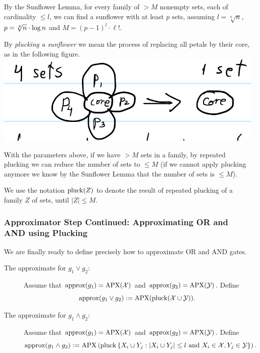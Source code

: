  By the Sunflower Lemma, for every family of $>M$ nonempty sets, each of cardinality $\leq l$, we can find a sunflower with at least $p$ sets, assuming    
$l=\sqrt[8]{n}$, $p =\sqrt[8]{n}\cdot\log n$ and $M=(p-1)^l \cdot \ell!$.

By \emph{plucking a sunflower} we mean the process of replacing all petals by their core, as in the following figure. 
\includegraphics[width=.6\linewidth]{images/pluck.png}


\begin{corollary}
With the parameters above, if we have $>M$ sets in a family, by repeated plucking we can reduce the number of sets to $\leq M$ (if we cannot apply plucking anymore we know by the Sunflower Lemma that the number of sets is $\leq M$).
\end{corollary}
We use the notation 
${\rm pluck}(Z)$ to denote the result of repeated plucking of a family $Z$ of sets, until $|Z| \leq M$.



\subsubsection{  Approximator Step Continued: Approximating OR and AND using Plucking}

We are finally ready to define precisely how to approximate OR and AND gates.
\begin{definition}

\begin{description}
\item[The approximate for $g_1\lor g_2$:] Assume that ${\rm approx}(g_1)=\mathrm{APX}(\mathcal{X})$ and ${\rm approx}(g_2)=\operatorname{\mathrm{APX}}(\mathcal{Y})$. Define 
$${\rm approx}(g_1\lor g_2):=\mathrm{APX}(\operatorname{pluck}(\mathcal{X} \cup \mathcal{Y})).$$

\item[The approximate  for $g_1\land g_2$:]
Assume that ${\rm approx}(g_1)=\mathrm{APX}(\mathcal{X})$ and ${\rm approx}(g_2)=\operatorname{\mathrm{APX}}(\mathcal{Y})$. Define 
$${\rm approx}(g_1\land g_2):=
    \mathrm{APX}
        \left(
            \operatorname{pluck}
                \left\{
                    X_i \cup Y_j:
                        \left|
                            X_i \cup Y_j
                        \right| 
                        \leq l \text{ and } 
                        X_i \in \mathcal{X}, Y_j \in \mathcal{Y}
                \right\}
       \right).
$$
\end{description}
\end{definition}


